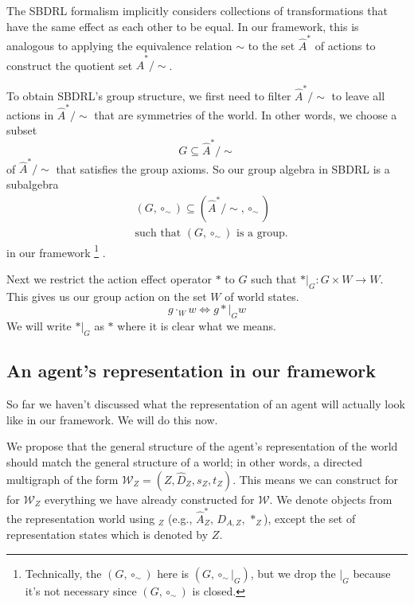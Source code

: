 The SBDRL formalism implicitly considers collections of transformations that have the same effect as each other to be equal.
In our framework, this is analogous to applying the equivalence relation $\sim$ to the set $\hat{A}^{*}$ of actions to construct the quotient set $\hat{A}^{*}/\sim$.

To obtain SBDRL's group structure, we first need to filter $\hat{A}^{*}/\sim$ to leave all actions in $\hat{A}^{*}/\sim$ that are symmetries of the world.
In other words, we choose a subset
\begin{equation}
    G \subseteq \hat{A}^{*}/\sim
\end{equation}
 of $\hat{A}^{*}/\sim$ that satisfies the group axioms.
 So our group algebra in SBDRL is a subalgebra
 \begin{equation}
 \begin{aligned}
     & (G, \circ_{\sim}) \subseteq (\hat{A}^{*}/\sim, \circ_{\sim}) \\
     & \text{such that } (G, \circ_{\sim}) \text{ is a group.}
 \end{aligned}
 \end{equation}
 in our framework
 \footnote{Technically, the $(G, \circ_{\sim})$ here is $(G, \circ_{\sim}|_{G})$, but we drop the $|_{G}$ because it's not necessary since $(G, \circ_{\sim})$ is closed.}
 .

Next we restrict the action effect operator $\ast$ to $G$ such that $\ast|_{G} : G \times W \to W$.
This gives us our group action on the set $W$ of world states.
\begin{equation}
    g \cdot_{W} w \iff g \ast|_{G} w
\end{equation}
We will write $\ast|_{G}$ as $\ast$ where it is clear what we means.

\subsection{An agent's representation in our framework}

So far we haven't discussed what the representation of an agent will actually look like in our framework.
We will do this now.

We propose that the general structure of the agent's representation of the world should match the general structure of a world; in other words, a directed multigraph of the form $\mathscr{W}_{Z} = (Z, \hat{D}_{Z}, s_{Z}, t_{Z})$.
This means we can construct for for $\mathscr{W}_{Z}$ everything we have already constructed for $\mathscr{W}$.
We denote objects from the representation world using $_{Z}$ (e.g., $\hat{A}^{\ast}_{Z}$, $D_{A, Z}$, $\ast_{Z}$), except the set of representation states which is denoted by $Z$.

